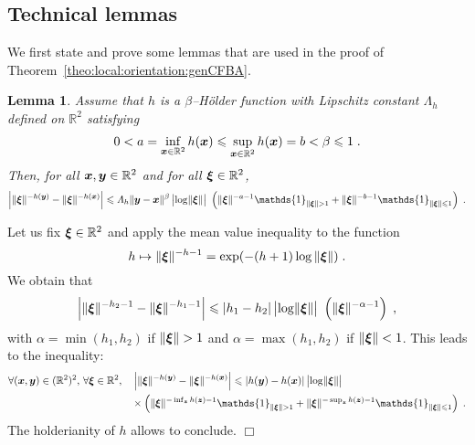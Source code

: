 \documentclass{elsarticle}
\newtheorem{lemma}{Lemma}
\newenvironment{proof}{\medskip\noindent{\bf Proof.}\;}{\null\hfill $\Box$\par\medskip }
\begin{document}
\subsection{Technical lemmas}
We first state and prove some lemmas that are used in the proof of Theorem~\ref{theo:local:orientation:genCFBA}.
\begin{lemma}\label{lem:1}
Assume that $h$ is a $\beta$--H\"older function with Lipschitz constant $\Lambda_h$ defined on $\mathbb{R}^2$ satisfying
\[
0<a=\inf_{\bm{x}\in \mathbb{R}^2} h(\bm{x})\leqslant \sup_{\bm{x}\in \mathbb{R}^2} h(\bm{x})=b<\beta\leqslant 1 \;.
\] 
Then, for all $\bm{x},\bm{y}\in \mathbb{R}^2$ and for all $\bm{\xi}\in \mathbb{R}^2$,
\[
\left|\lVert \vect{\xi}\rVert^{-h(\vect{y})}-\lVert \vect{\xi}\rVert^{-h(\vect{x})}\right|\leq \Lambda_h\|\vect{y}-\vect{x}\|^\beta\,\abs{\log \lVert \vect{\xi} \rVert}~ \left(\lVert \vect{\xi} \rVert^{-a-1}\mathds{1}_{\lVert \vect{\xi}\rVert>1}+\lVert \vect{\xi} \rVert^{-b-1}\mathds{1}_{\lVert \vect{\xi}\rVert\leq 1}\right)\;.
\] 
\end{lemma}
\begin{proof}
Let us fix $\bm{\xi}\in \mathbb{R}^2$ and apply the mean value inequality to the function  
\[
h\mapsto \lVert \bm{\xi} \rVert^{-h-1}=\exp(-(h+1) \log  \| \bm{\xi} \|)\;.
\]
We obtain that
\[
\left|\lVert \bm{\xi} \rVert^{-h_2-1}-\lVert \bm{\xi} \rVert^{-h_1-1}\right|\leqslant |h_1-h_2|\,\abs{\log \lVert \bm{\xi} \rVert}~ \left(\lVert \bm{\xi} \rVert^{-\alpha-1}\right)\;,
\]
with
$\alpha=\min (h_1,h_2)$ if $\lVert \bm{\xi}\rVert>1$ and $\alpha=\max (h_1,h_2)$ if $\lVert \bm{\xi} \rVert<1$.
This leads to the inequality:
\begin{align*}
&\forall (\vect{x},\vect{y})\in (\mathbb{R}^2)^2,\,\forall \vect{\xi}\in \mathbb{R}^2,\quad \left|\lVert \vect{\xi}\rVert^{-h(\vect{y})}-\lVert \vect{\xi}\rVert^{-h(\vect{x})}\right|\leq  \lvert h(\vect{y})-h(\vect{x})\rvert\, \abs{\log \lVert \vect{\xi} \rVert}\\
&\qquad \qquad \qquad \qquad \qquad \qquad\times \left(\lVert \vect{\xi} \rVert^{-\inf_{\vect{z}} h(\vect{z})-1}\mathds{1}_{\lVert \vect{\xi}\rVert>1}+\lVert \vect{\xi} \rVert^{-\sup_{\vect{z}} h(\vect{z})-1}\mathds{1}_{\lVert \vect{\xi}\rVert\leq 1}\right)\;.
\end{align*}
The holderianity of $h$ allows to conclude.
\end{proof}
\end{document}
